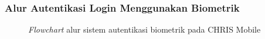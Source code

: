 \subsubsection{Alur Autentikasi Login Menggunakan Biometrik}
\begin{figure}[H]
    \centering
    \caption{\textit{Flowchart} alur sistem autentikasi biometrik pada CHRIS Mobile}
    \label{fig:flowchart_autentikasi_biometrik_chris_mobile}
\end{figure}
